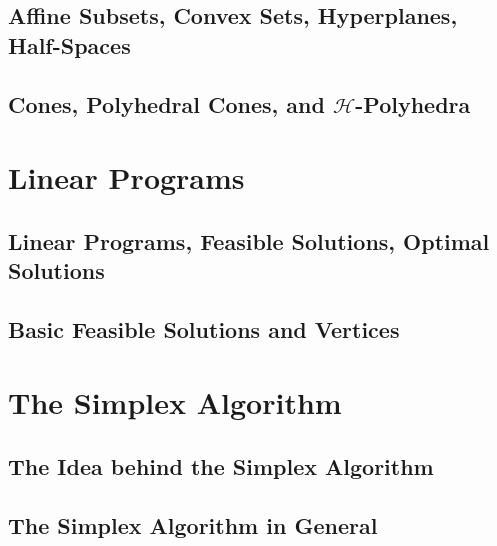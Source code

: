 \documentclass[a4paper]{article}
\begin{document}
\subsection{ Affine Subsets, Convex Sets, Hyperplanes, Half-Spaces} %

\subsection{ Cones, Polyhedral Cones, and $\mathcal{H}$-Polyhedra} %


\newpage
\section{Linear Programs}
\subsection{ Linear Programs, Feasible Solutions, Optimal Solutions} %

\subsection{ Basic Feasible Solutions and Vertices} %


\newpage
\section{The Simplex Algorithm}
\subsection{ The Idea behind the Simplex Algorithm} %

\subsection{ The Simplex Algorithm in General} %
\end{document}
